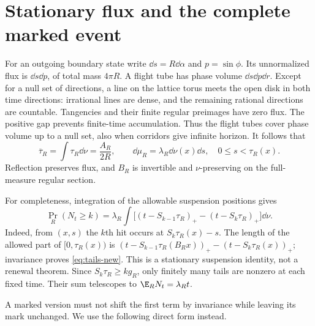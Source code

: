 \section{Stationary flux and the complete marked event}
\label{sec:flux}
For an outgoing boundary state write $\dd s=R\dd\alpha$ and
$p=\sin\phi$. Its unnormalized flux is $\dd s\dd p$, of total mass
$4\pi R$. A flight tube has phase volume $\dd s\dd p\dd r$.
Except for a null set of directions, a line on the lattice torus meets
the open disk in both time directions: irrational lines are dense, and
the remaining rational directions are countable. Tangencies and their
finite regular preimages have zero flux. The positive gap prevents
finite-time accumulation. Thus the flight tubes cover phase volume up
to a null set, also when corridors give infinite horizon. It follows that
\begin{equation}\label{eq:santalo}
 \overline\tau_R=\int\tau_R\dd\nu=\frac{A_R}{2R},\qquad
 \dd\mu_R=\lambda_R\dd\nu(x)\dd s,\quad 0\le s<\tau_R(x).
\end{equation}
Reflection preserves flux, and $B_R$ is invertible and $\nu$-preserving
on the full-measure regular section.

For completeness, integration of the allowable suspension positions gives
\begin{equation}\label{eq:tails-new}
 \Pr_R(N_t\ge k)=\lambda_R\int
       \bigl[(t-S_{k-1}\tau_R)_+-(t-S_k\tau_R)_+\bigr]\dd\nu.
\end{equation}
Indeed, from $(x,s)$ the $k$th hit occurs at $S_k\tau_R(x)-s$.
The length of the allowed part of $[0,\tau_R(x))$ is
$(t-S_{k-1}\tau_R(B_Rx))_+-(t-S_k\tau_R(x))_+$; invariance proves
\eqref{eq:tails-new}. This is a stationary suspension identity, not a
renewal theorem. Since $S_k\tau_R\ge kg_R$, only finitely many tails
are nonzero at each fixed time. Their sum telescopes to
$\E_RN_t=\lambda_Rt$.

A marked version must not shift the first term by invariance while leaving
its mark unchanged. We use the following direct form instead.

